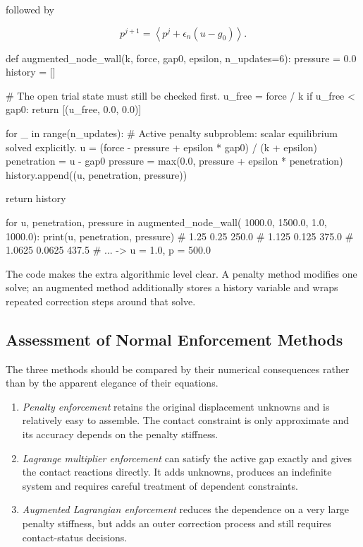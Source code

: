 followed by

\begin{equation}
    p^{j+1}=\left\langle p^j+\epsilon_n(u-g_0)\right\rangle.
\end{equation}

\begin{python}
def augmented_node_wall(k, force, gap0, epsilon, n_updates=6):
    pressure = 0.0
    history = []

    # The open trial state must still be checked first.
    u_free = force / k
    if u_free < gap0:
        return [(u_free, 0.0, 0.0)]

    for _ in range(n_updates):
        # Active penalty subproblem: scalar equilibrium solved explicitly.
        u = (force - pressure + epsilon * gap0) / (k + epsilon)
        penetration = u - gap0
        pressure = max(0.0, pressure + epsilon * penetration)
        history.append((u, penetration, pressure))

    return history


for u, penetration, pressure in augmented_node_wall(
        1000.0, 1500.0, 1.0, 1000.0):
    print(u, penetration, pressure)
# 1.25      0.25      250.0
# 1.125     0.125     375.0
# 1.0625    0.0625    437.5
# ... -> u = 1.0, p = 500.0
\end{python}

The code makes the extra algorithmic level clear. A penalty method modifies one
solve; an augmented method additionally stores a history variable and wraps
repeated correction steps around that solve.

\subsection{Assessment of Normal Enforcement Methods}

The three methods should be compared by their numerical consequences rather
than by the apparent elegance of their equations.

\begin{enumerate}
    \item \textit{Penalty enforcement} retains the original displacement unknowns
        and is relatively easy to assemble. The contact constraint is only
        approximate and its accuracy depends on the penalty stiffness.

    \item \textit{Lagrange multiplier enforcement} can satisfy the active gap
        exactly and gives the contact reactions directly. It adds unknowns,
        produces an indefinite system and requires careful treatment of dependent
        constraints.

    \item \textit{Augmented Lagrangian enforcement} reduces the dependence on a
        very large penalty stiffness, but adds an outer correction process and
        still requires contact-status decisions.
\end{enumerate}


